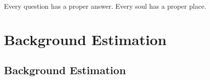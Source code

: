 \begin{savequote}[75mm]
Every question has a proper answer. Every soul has a proper place.
\end{savequote}

\chapter{Background Estimation}
\section{Background Estimation}
\label{sec:backgrounds}
